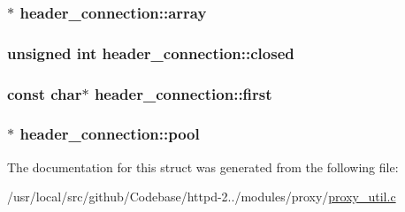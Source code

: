 \subsubsection[{\texorpdfstring{array}{array}}]{$\ast$ header\+\_\+connection\+::array}\hypertarget{structheader__connection_a113b187581b43943341ffb9a02fd70a4}{}\label{structheader__connection_a113b187581b43943341ffb9a02fd70a4}
\subsubsection[{\texorpdfstring{closed}{closed}}]{\setlength{\rightskip}{0pt plus 5cm}unsigned {\bf int} header\+\_\+connection\+::closed}\hypertarget{structheader__connection_aa8ef359394d52be89ba2e2ea31d11de2}{}\label{structheader__connection_aa8ef359394d52be89ba2e2ea31d11de2}
\subsubsection[{\texorpdfstring{first}{first}}]{\setlength{\rightskip}{0pt plus 5cm}const char$\ast$ header\+\_\+connection\+::first}\hypertarget{structheader__connection_a72b1df3d9eca6e33e820c36aa8c1d193}{}\label{structheader__connection_a72b1df3d9eca6e33e820c36aa8c1d193}
\subsubsection[{\texorpdfstring{pool}{pool}}]{$\ast$ header\+\_\+connection\+::pool}\hypertarget{structheader__connection_a117a3b4fdca089855b190ca7eef6cd6f}{}\label{structheader__connection_a117a3b4fdca089855b190ca7eef6cd6f}


The documentation for this struct was generated from the following file\+:\begin{DoxyCompactItemize}
\item 
/usr/local/src/github/\+Codebase/httpd-\/2../modules/proxy/\hyperlink{proxy__util_8c}{proxy\+\_\+util.\+c}\end{DoxyCompactItemize}
